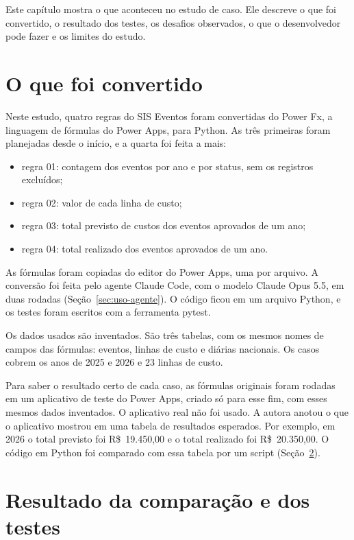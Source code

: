 
Este capítulo mostra o que aconteceu no estudo de caso. Ele descreve o que foi convertido, o resultado dos testes, os desafios observados, o que o desenvolvedor pode fazer e os limites do estudo.

\section{O que foi convertido}
\label{sec:convertido}

Neste estudo, quatro regras do SIS Eventos foram convertidas do Power Fx, a linguagem de fórmulas do Power Apps, para Python. As três primeiras foram planejadas desde o início, e a quarta foi feita a mais:

\begin{itemize}
    \item regra 01: contagem dos eventos por ano e por status, sem os registros excluídos;
    \item regra 02: valor de cada linha de custo;
    \item regra 03: total previsto de custos dos eventos aprovados de um ano;
    \item regra 04: total realizado dos eventos aprovados de um ano.
\end{itemize}

As fórmulas foram copiadas do editor do Power Apps, uma por arquivo. A conversão foi feita pelo agente Claude Code, com o modelo Claude Opus 5.5, em duas rodadas (Seção~\ref{sec:uso-agente}). O código ficou em um arquivo Python, e os testes foram escritos com a ferramenta pytest.

Os dados usados são inventados. São três tabelas, com os mesmos nomes de campos das fórmulas: eventos, linhas de custo e diárias nacionais. Os casos cobrem os anos de 2025 e 2026 e 23 linhas de custo.

Para saber o resultado certo de cada caso, as fórmulas originais foram rodadas em um aplicativo de teste do Power Apps, criado só para esse fim, com esses mesmos dados inventados. O aplicativo real não foi usado. A autora anotou o que o aplicativo mostrou em uma tabela de resultados esperados. Por exemplo, em 2026 o total previsto foi R\$~19.450,00 e o total realizado foi R\$~20.350,00. O código em Python foi comparado com essa tabela por um script (Seção~\ref{sec:testes}).

\section{Resultado da comparação e dos testes}
\label{sec:testes}

